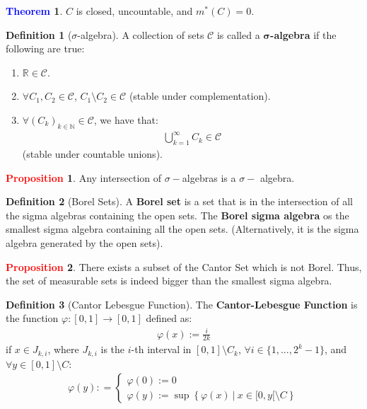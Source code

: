 \documentclass[11pt]{article}
\theoremstyle{definition}
\newcommand{\bb}[1]{\mathbb{#1}}
\newcommand{\sets}[2]{ \left\{ #1\ |\ #2 \right\}}
\newtheorem{theorem}{\textcolor{blue}{Theorem}}
\theoremstyle{definition}
\newtheorem{definition}{\textcolor{OliveGreen}{Definition}}
\newtheorem{prop}{\textcolor{red}{Proposition}}
\theoremstyle{remark}
\begin{document}
\begin{theorem}
	$C$ is closed, uncountable, and $m^*(C) = 0$. 
\end{theorem}

\begin{definition}[$\sigma$-algebra]
	A collection of sets $\mathcal{C}$ is called a $\mathbf{\sigma}$\textbf{-algebra} if the following are true: 
	\begin{enumerate}[nolistsep]
		\item $\bb{R} \in \mathcal{C}$. 
		\item $\forall C_1, C_2 \in \mathcal{C}$, $C_1 \setminus C_2 \in \mathcal{C}$ (stable under complementation). 
		\item $\forall (C_k)_{k \in \bb{N}} \in \mathcal{C}$, we have that: 
		\begin{align*}
			\bigcup_{k=1}^\infty C_k \in \mathcal{C} 	
		\end{align*}
		(stable under countable unions). 
	\end{enumerate}
\end{definition}

\begin{prop}
	Any intersection of $\sigma-$algebras is a $\sigma-$ algebra. 
\end{prop}

\begin{definition}[Borel Sets]
	A \textbf{Borel set} is a set that is in the intersection of all the sigma algebras containing the open sets. The \textbf{Borel sigma algebra} os the smallest sigma algebra containing all the open sets. (Alternatively, it is the sigma algebra generated by the open sets). 
\end{definition}

\begin{prop}
	There exists a subset of the Cantor Set which is not Borel. Thus, the set of measurable sets is indeed bigger than the smallest sigma algebra. 
\end{prop}

\begin{definition}[Cantor Lebesgue Function]
	The \textbf{Cantor-Lebesgue Function} is the function $\varphi: [0,1] \rightarrow [0,1]$ defined as: 
	\begin{align}
		\varphi(x) := \frac{i}{2k}
	\end{align}
	if $x \in J_{k,i}$, where $J_{k,i}$ is the $i$-th interval in $[0,1] \setminus C_k$, $\forall i \in \{ 1,..., 2^k -1 \}$, and $\forall y \in [0,1] \setminus C$: 
	\begin{align}
		\varphi(y) : = \begin{cases}
				\varphi(0) := 0 \\
				\varphi(y) := \sup \sets{\varphi(x)}{x \in [0,y[ \setminus C}
		\end{cases}
	\end{align}
\end{definition}
\end{document}
